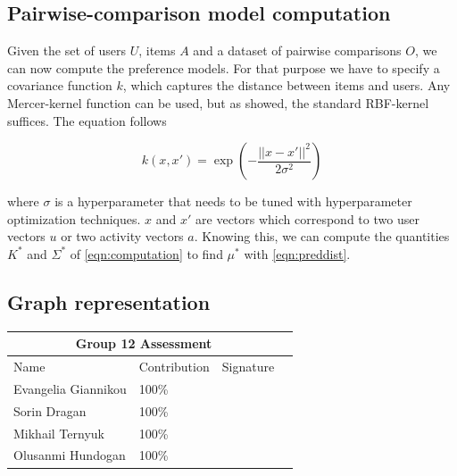 \documentclass[11pt,a4paper,oneside]{article}
\begin{document}
\subsection{Pairwise-comparison model computation}
Given the set of users $U$, items $A$ and a dataset of pairwise comparisons $O$, we can now compute the preference models. For that purpose we have to specify a covariance function $k$, which captures the distance between items and users. Any Mercer-kernel function can be used, but as \citeauthor{guo_GaussianProcessPreference_2010} showed, the standard RBF-kernel suffices. The equation follows 

\begin{equation}
k(x, x') = \exp\left(-\frac{|| x - x' ||^2}{2\sigma^2}\right)
\end{equation}

where $\sigma$ is a hyperparameter that needs to be tuned with hyperparameter optimization techniques. $x$ and $x'$ are vectors which correspond to two user vectors $u$ or two activity vectors $a$. Knowing this, we can compute the quantities $K^*$ and $\Sigma^*$ of \autoref{eqn:computation} to find $\mu^*$ with \autoref{eqn:preddist}.

\subsection{Graph representation}

\clearpage 
\printbibliography

\clearpage
\Large
\begin{tabularx}{\textwidth}{|X|X|X|X|}
\hline
\multicolumn{3}{|c|}{Group 12 Assessment}    \\ \hline
Name                & Contribution & Signature \\ \hline
\hline
Evangelia Giannikou & 100\%        &           \\ \hline
Sorin Dragan        & 100\%        &           \\ \hline
Mikhail Ternyuk     & 100\%        &           \\ \hline
Olusanmi Hundogan   & 100\%        &           \\ \hline
\end{tabularx}
\end{document}

